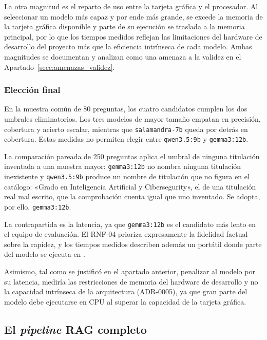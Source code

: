La otra magnitud es el reparto de uso entre la tarjeta gráfica y el procesador. Al seleccionar un modelo más capaz y por ende más grande, se excede la memoria de la tarjeta gráfica disponible y parte de su ejecución se traslada a la memoria principal, por lo que los tiempos medidos reflejan las limitaciones del hardware de desarrollo del proyecto más que la eficiencia intrínseca de cada modelo. Ambas magnitudes se documentan y analizan como una amenaza a la validez en el Apartado~\ref{secc:amenazas_validez}.

\subsubsection[Elección final]{Elección final}
\label{secc:eleccion_gemma3}

En la muestra común de 80 preguntas, los cuatro candidatos cumplen los dos umbrales eliminatorios. Los tres modelos de mayor tamaño empatan en precisión, cobertura y acierto escalar, mientras que \texttt{salamandra-7b} queda por detrás en cobertura. Estas medidas no permiten elegir entre \texttt{qwen3.5:9b} y \texttt{gemma3:12b}.

La comparación pareada de 250 preguntas aplica el umbral de ninguna titulación inventada a una muestra mayor: \texttt{gemma3:12b} no nombra ninguna titulación inexistente y \texttt{qwen3.5:9b} produce un nombre de titulación que no figura en el catálogo: «Grado en Inteligencia Artificial y Cibersegurity», el de una titulación real mal escrito, que la comprobación cuenta igual que uno inventado. Se adopta, por ello, \texttt{gemma3:12b}.

La contrapartida es la latencia, ya que \texttt{gemma3:12b} es el candidato más lento en el equipo de evaluación. El RNF-04 prioriza expresamente la fidelidad factual sobre la rapidez, y los tiempos medidos describen además un portátil donde parte del modelo se ejecuta en .

Asimismo, tal como se justificó en el apartado anterior, penalizar al modelo por su latencia, mediría las restricciones de memoria del hardware de desarrollo y no la capacidad intrínseca de la arquitectura (ADR-0005\cite{repo_tfg}), ya que gran parte del modelo debe ejecutarse en CPU al superar la capacidad de la tarjeta gráfica.


\subsection[El \textit{pipeline} RAG completo]{El \textit{pipeline} RAG completo}
\label{secc:fase2_pipeline}

